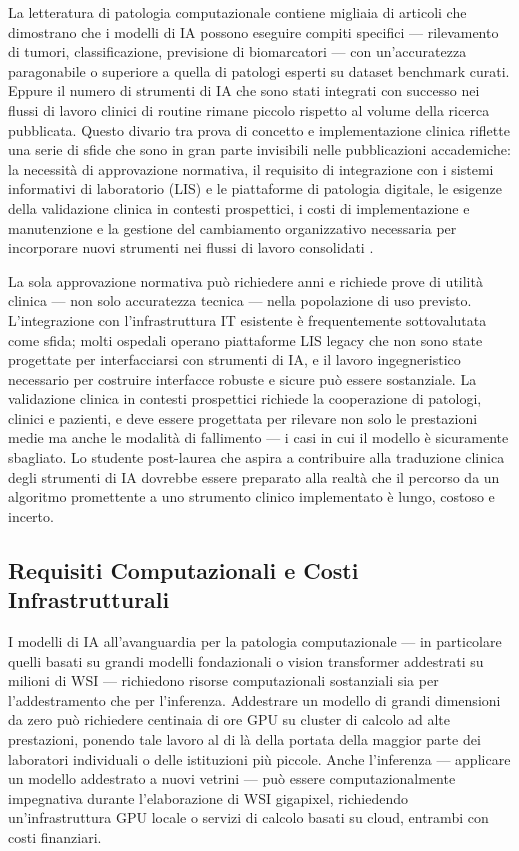 La letteratura di patologia computazionale contiene migliaia di articoli che dimostrano che i modelli di IA possono eseguire compiti specifici — rilevamento di tumori, classificazione, previsione di biomarcatori — con un'accuratezza paragonabile o superiore a quella di patologi esperti su dataset benchmark curati. Eppure il numero di strumenti di IA che sono stati integrati con successo nei flussi di lavoro clinici di routine rimane piccolo rispetto al volume della ricerca pubblicata. Questo divario tra prova di concetto e implementazione clinica riflette una serie di sfide che sono in gran parte invisibili nelle pubblicazioni accademiche: la necessità di approvazione normativa, il requisito di integrazione con i sistemi informativi di laboratorio (LIS) e le piattaforme di patologia digitale, le esigenze della validazione clinica in contesti prospettici, i costi di implementazione e manutenzione e la gestione del cambiamento organizzativo necessaria per incorporare nuovi strumenti nei flussi di lavoro consolidati \cite{song2023}.

La sola approvazione normativa può richiedere anni e richiede prove di utilità clinica — non solo accuratezza tecnica — nella popolazione di uso previsto. L'integrazione con l'infrastruttura IT esistente è frequentemente sottovalutata come sfida; molti ospedali operano piattaforme LIS legacy che non sono state progettate per interfacciarsi con strumenti di IA, e il lavoro ingegneristico necessario per costruire interfacce robuste e sicure può essere sostanziale. La validazione clinica in contesti prospettici richiede la cooperazione di patologi, clinici e pazienti, e deve essere progettata per rilevare non solo le prestazioni medie ma anche le modalità di fallimento — i casi in cui il modello è sicuramente sbagliato. Lo studente post-laurea che aspira a contribuire alla traduzione clinica degli strumenti di IA dovrebbe essere preparato alla realtà che il percorso da un algoritmo promettente a uno strumento clinico implementato è lungo, costoso e incerto.

\subsection{Requisiti Computazionali e Costi Infrastrutturali}

I modelli di IA all'avanguardia per la patologia computazionale — in particolare quelli basati su grandi modelli fondazionali o vision transformer addestrati su milioni di WSI — richiedono risorse computazionali sostanziali sia per l'addestramento che per l'inferenza. Addestrare un modello di grandi dimensioni da zero può richiedere centinaia di ore GPU su cluster di calcolo ad alte prestazioni, ponendo tale lavoro al di là della portata della maggior parte dei laboratori individuali o delle istituzioni più piccole. Anche l'inferenza — applicare un modello addestrato a nuovi vetrini — può essere computazionalmente impegnativa durante l'elaborazione di WSI gigapixel, richiedendo un'infrastruttura GPU locale o servizi di calcolo basati su cloud, entrambi con costi finanziari.

